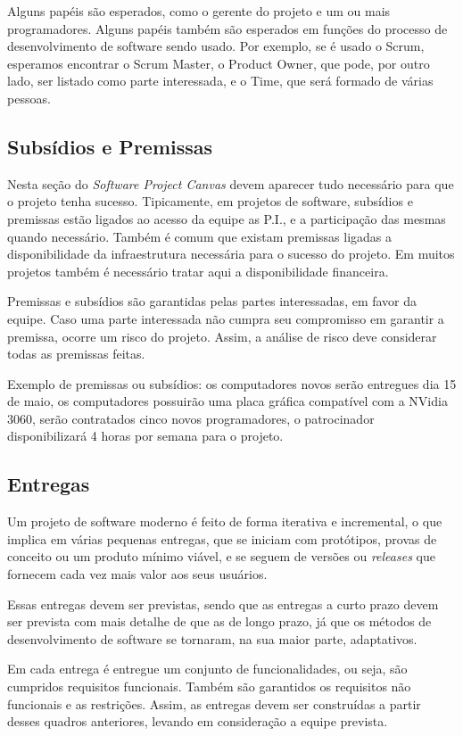 \documentclass{article}
\begin{document}
Alguns papéis são esperados\citeauthor{finocchio:2013}, como o gerente do projeto e um ou mais programadores. Alguns papéis também são esperados em funções do processo de desenvolvimento de software sendo usado. Por exemplo, se é usado o Scrum, esperamos encontrar o Scrum Master, o Product Owner, que pode, por outro lado, ser listado como parte interessada, e o Time, que será formado de várias pessoas.
\subsection{Subsídios e Premissas}
Nesta seção do \textit{Software Project Canvas} devem aparecer tudo necessário para que o projeto tenha sucesso. Tipicamente, em projetos de software, subsídios e premissas estão ligados ao acesso da equipe as P.I., e a participação das mesmas quando necessário. Também é comum que existam premissas ligadas a disponibilidade da infraestrutura necessária para o sucesso do projeto. Em muitos projetos também é necessário tratar aqui a disponibilidade financeira.

Premissas e subsídios são garantidas pelas partes interessadas, em favor da equipe. Caso uma parte interessada não cumpra seu compromisso em garantir a premissa, ocorre um risco do projeto. Assim, a análise de risco deve considerar todas as premissas feitas. 

Exemplo de premissas ou subsídios: os computadores novos serão entregues dia 15 de maio, os computadores possuirão uma placa gráfica compatível com a NVidia 3060, serão contratados cinco novos programadores, o patrocinador disponibilizará 4 horas por semana para o projeto. 

\subsection{Entregas}

Um projeto de software moderno é feito de forma iterativa e incremental\citep{pressman:2019,essential:scrum}, o que implica em várias pequenas entregas, que se iniciam com protótipos, provas de conceito ou um produto mínimo viável, e se seguem de versões ou \textit{releases} que fornecem cada vez mais valor aos seus usuários.

Essas entregas devem ser previstas, sendo que as entregas a curto prazo devem ser prevista com mais detalhe de que as de longo prazo, já que os métodos de desenvolvimento de software se tornaram, na sua maior parte, adaptativos.

Em cada entrega é entregue um conjunto de funcionalidades, ou seja, são cumpridos requisitos funcionais. Também são garantidos os requisitos não funcionais e as restrições. Assim, as entregas devem ser construídas a partir desses quadros anteriores, levando em consideração a equipe prevista.
\end{document}
